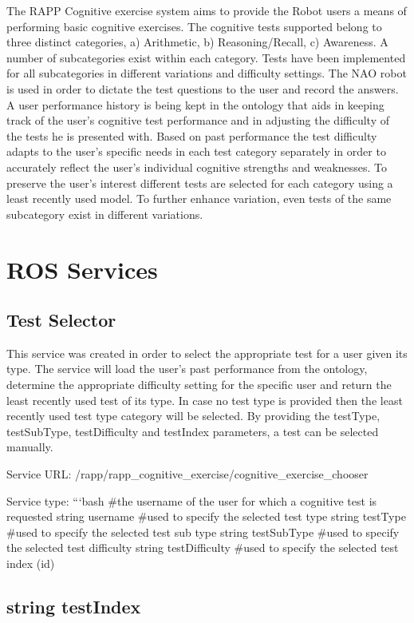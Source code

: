 The R\-A\-P\-P Cognitive exercise system aims to provide the Robot users a means of performing basic cognitive exercises. The cognitive tests supported belong to three distinct categories, a) Arithmetic, b) Reasoning/\-Recall, c) Awareness. A number of subcategories exist within each category. Tests have been implemented for all subcategories in different variations and difficulty settings. The N\-A\-O robot is used in order to dictate the test questions to the user and record the answers. A user performance history is being kept in the ontology that aids in keeping track of the user’s cognitive test performance and in adjusting the difficulty of the tests he is presented with. Based on past performance the test difficulty adapts to the user’s specific needs in each test category separately in order to accurately reflect the user’s individual cognitive strengths and weaknesses. To preserve the user’s interest different tests are selected for each category using a least recently used model. To further enhance variation, even tests of the same subcategory exist in different variations.

\section*{R\-O\-S Services}

\subsection*{Test Selector}

This service was created in order to select the appropriate test for a user given its type. The service will load the user’s past performance from the ontology, determine the appropriate difficulty setting for the specific user and return the least recently used test of its type. In case no test type is provided then the least recently used test type category will be selected. By providing the test\-Type, test\-Sub\-Type, test\-Difficulty and test\-Index parameters, a test can be selected manually.

Service U\-R\-L\-: {\ttfamily /rapp/rapp\-\_\-cognitive\-\_\-exercise/cognitive\-\_\-exercise\-\_\-chooser}

Service type\-: ```bash \#the username of the user for which a cognitive test is requested string username \#used to specify the selected test type string test\-Type \#used to specify the selected test sub type string test\-Sub\-Type \#used to specify the selected test difficulty string test\-Difficulty \#used to specify the selected test index (id) \subsection*{string test\-Index }

